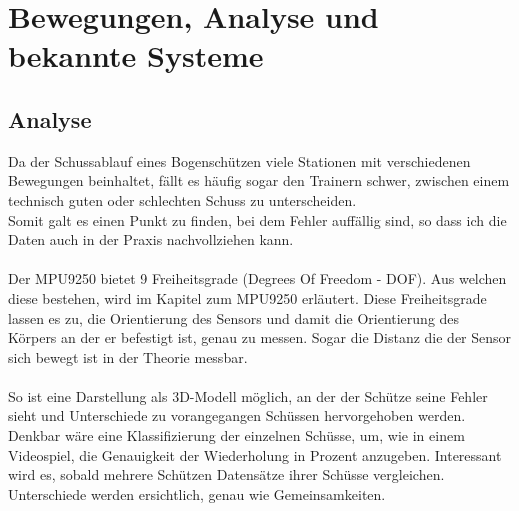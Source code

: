\chapter{Bewegungen, Analyse und bekannte Systeme}
\section{Analyse}
Da der Schussablauf eines Bogenschützen viele Stationen mit verschiedenen Bewegungen 
beinhaltet, fällt es häufig sogar den Trainern schwer, zwischen einem technisch guten
oder schlechten Schuss zu unterscheiden.\\ 
Somit galt es einen Punkt zu finden, bei dem Fehler auffällig sind, so dass ich die Daten auch in 
der Praxis nachvollziehen kann.\\
\\
Der MPU9250 bietet 9 Freiheitsgrade (Degrees Of Freedom - DOF). Aus welchen diese bestehen, wird
im Kapitel zum MPU9250 erläutert. Diese Freiheitsgrade lassen es zu, die Orientierung des Sensors 
und damit die Orientierung des Körpers an der er befestigt ist, genau zu messen. Sogar die Distanz 
die der Sensor sich bewegt ist in der Theorie messbar.\\
\\
So ist eine Darstellung als 3D-Modell möglich, an der der Schütze seine Fehler sieht und Unterschiede
zu vorangegangen Schüssen hervorgehoben werden. \\
Denkbar wäre eine Klassifizierung der einzelnen Schüsse, um, wie in einem Videospiel, die Genauigkeit
der Wiederholung in Prozent anzugeben. Interessant wird es, sobald mehrere Schützen Datensätze
ihrer Schüsse vergleichen. Unterschiede werden ersichtlich, genau wie Gemeinsamkeiten.\\

